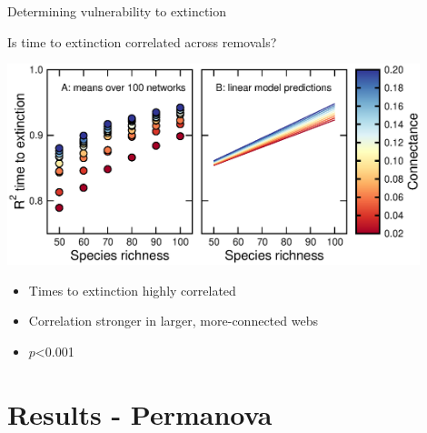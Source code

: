 \documentclass{beamer}
\begin{document}
  \begin{frame}{Determining vulnerability to extinction}

    \begin{block}{Is time to extinction correlated across removals?}

    \vspace{0.2cm}

    \begin{centering}
    
      \includegraphics[width=0.9\textwidth]{../manuscript/figures/extinction_order/extorder_correlations_talk_full.eps}
    
      \end{centering}

    \end{block}

    \begin{itemize}
      \item Times to extinction highly correlated
      \item Correlation stronger in larger, more-connected webs
      \item $p$\textless0.001
    \end{itemize}

    \end{frame}

\section*{Results - Permanova} %
\end{document}
